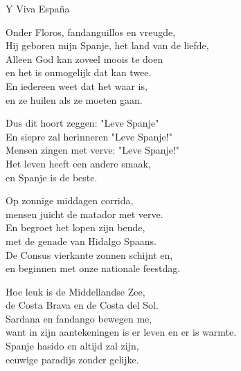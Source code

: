 \begin{song}{Y Viva España}
\end{song}

\clearpage
\begin{translation}
Onder Floros, fandanguillos en vreugde,\\
Hij geboren mijn Spanje, het land van de liefde,\\
Alleen God kan zoveel moois te doen\\
en het is onmogelijk dat kan twee.\\
En iedereen weet dat het waar is,\\
en ze huilen als ze moeten gaan.\vspace{\wlskip}

Dus dit hoort zeggen: "Leve Spanje"\\
En siepre zal herinneren "Leve Spanje!"\\
Mensen zingen met verve: "Leve Spanje!"\\
Het leven heeft een andere smaak,\\
en Spanje is de beste.\vspace{\wlskip}

Op zonnige middagen corrida,\\
mensen juicht de matador met verve.\\
En begroet het lopen zijn bende,\\
met de genade van Hidalgo Spaans.\\
De Consus vierkante zonnen schijnt en,\\
en beginnen met onze nationale feestdag.\vspace{\wlskip}

Hoe leuk is de Middellandse Zee,\\
de Costa Brava en de Costa del Sol.\\
Sardana en fandango bewegen me,\\
want in zijn aantekeningen is er leven en er is warmte.\\
Spanje hasido en altijd zal zijn,\\
eeuwige paradijs zonder gelijke.
\end{translation}

